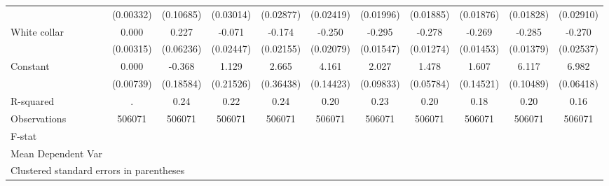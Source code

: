 {\begin{tabular}{l*{10}{c}}
                    &   (0.00332)         &   (0.10685)         &   (0.03014)         &   (0.02877)         &   (0.02419)         &   (0.01996)         &   (0.01885)         &   (0.01876)         &   (0.01828)         &   (0.02910)         \\
White collar        &       0.000         &       0.227\sym{***}&      -0.071\sym{**} &      -0.174\sym{***}&      -0.250\sym{***}&      -0.295\sym{***}&      -0.278\sym{***}&      -0.269\sym{***}&      -0.285\sym{***}&      -0.270\sym{***}\\
                    &   (0.00315)         &   (0.06236)         &   (0.02447)         &   (0.02155)         &   (0.02079)         &   (0.01547)         &   (0.01274)         &   (0.01453)         &   (0.01379)         &   (0.02537)         \\
Constant            &       0.000         &      -0.368\sym{*}  &       1.129\sym{***}&       2.665\sym{***}&       4.161\sym{***}&       2.027\sym{***}&       1.478\sym{***}&       1.607\sym{***}&       6.117\sym{***}&       6.982\sym{***}\\
                    &   (0.00739)         &   (0.18584)         &   (0.21526)         &   (0.36438)         &   (0.14423)         &   (0.09833)         &   (0.05784)         &   (0.14521)         &   (0.10489)         &   (0.06418)         \\
\hline
R-squared           &           .         &        0.24         &        0.22         &        0.24         &        0.20         &        0.23         &        0.20         &        0.18         &        0.20         &        0.16         \\
Observations        &      506071         &      506071         &      506071         &      506071         &      506071         &      506071         &      506071         &      506071         &      506071         &      506071         \\
F-stat              &                     &                     &                     &                     &                     &                     &                     &                     &                     &                     \\
Mean Dependent Var  &                     &                     &                     &                     &                     &                     &                     &                     &                     &                     \\
\hline\hline
\multicolumn{11}{l}{\footnotesize Clustered standard errors in parentheses}\\
\end{tabular}
}
